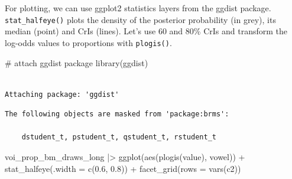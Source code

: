 \documentclass[
  authoryear,
  preprint,
  3p]{elsarticle}
\newenvironment{Shaded}{\begin{snugshade}}{\end{snugshade}}
\newcommand{\AttributeTok}[1]{\textcolor[rgb]{0.40,0.45,0.13}{#1}}
\newcommand{\CommentTok}[1]{\textcolor[rgb]{0.37,0.37,0.37}{#1}}
\newcommand{\FloatTok}[1]{\textcolor[rgb]{0.68,0.00,0.00}{#1}}
\newcommand{\FunctionTok}[1]{\textcolor[rgb]{0.28,0.35,0.67}{#1}}
\newcommand{\NormalTok}[1]{\textcolor[rgb]{0.00,0.23,0.31}{#1}}
\newcommand{\SpecialCharTok}[1]{\textcolor[rgb]{0.37,0.37,0.37}{#1}}
\begin{document}
For plotting, we can use ggplot2 statistics layers from the ggdist
package. \texttt{stat\_halfeye()} plots the density of the posterior
probability (in grey), its median (point) and CrIs (lines). Let's use 60
and 80\% CrIs and transform the log-odds values to proportions with
\texttt{plogis()}.

\begin{Shaded}
\begin{Highlighting}[]
\CommentTok{\# attach ggdist package}
\FunctionTok{library}\NormalTok{(ggdist)}
\end{Highlighting}
\end{Shaded}

\begin{verbatim}

Attaching package: 'ggdist'
\end{verbatim}

\begin{verbatim}
The following objects are masked from 'package:brms':

    dstudent_t, pstudent_t, qstudent_t, rstudent_t
\end{verbatim}

\begin{Shaded}
\begin{Highlighting}[]
\NormalTok{voi\_prop\_bm\_draws\_long }\SpecialCharTok{|\textgreater{}} 
  \FunctionTok{ggplot}\NormalTok{(}\FunctionTok{aes}\NormalTok{(}\FunctionTok{plogis}\NormalTok{(value), vowel)) }\SpecialCharTok{+}
  \FunctionTok{stat\_halfeye}\NormalTok{(}\AttributeTok{.width =} \FunctionTok{c}\NormalTok{(}\FloatTok{0.6}\NormalTok{, }\FloatTok{0.8}\NormalTok{)) }\SpecialCharTok{+}
  \FunctionTok{facet\_grid}\NormalTok{(}\AttributeTok{rows =} \FunctionTok{vars}\NormalTok{(c2))}
\end{Highlighting}
\end{Shaded}

\begin{figure}[H]


\caption{\label{fig-voi-prop-bm-1}}

\end{figure}%
\end{document}
